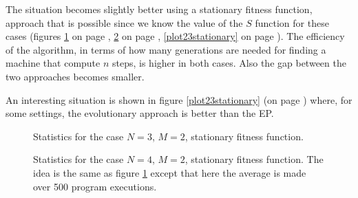 The situation becomes slightly better using a stationary fitness function, approach that is possible since we know the value of the $S$ function for these cases (figures \ref{plot32stationary} on page \pageref{plot32stationary}, \ref{plot42stationary} on page \pageref{plot42stationary}, \ref{plot23stationary} on page \pageref{plot23stationary}). The efficiency of the algorithm, in terms of how many generations are needed for finding a machine that compute $n$ steps, is higher in both cases. Also the gap between the two approaches becomes smaller.

An interesting situation is shown in figure \ref{plot23stationary} (on page \pageref{plot23stationary}) where, for some settings, the evolutionary approach is better than the EP.

\begin{figure}[h]
\centering
{}
\caption[]{Statistics for the case $N=3$, $M=2$, stationary fitness function.}
\label{plot32stationary}
\end{figure}


\begin{figure}[h]
\centering
{}
\caption[]{Statistics for the case $N=4$, $M=2$, stationary fitness function. The idea is the same as figure \ref{plot32stationary} except that here the average is made over 500 program executions.}
\label{plot42stationary}
\end{figure}


